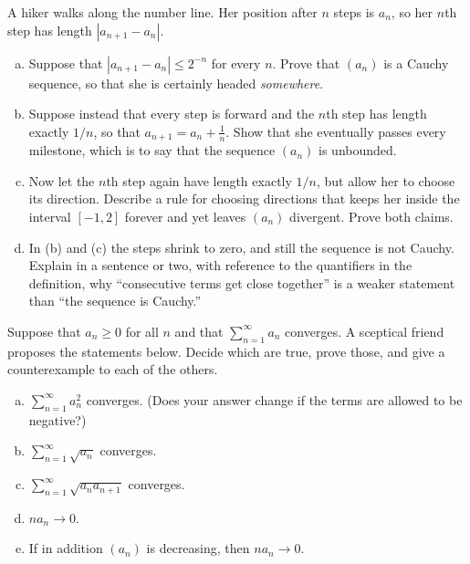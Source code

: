 \begin{problem}
A hiker walks along the number line.  Her position after $n$ steps is $a_n$, so her $n$th step has length $|a_{n+1} - a_n|$.
\begin{enumerate}[(a)]
	\item Suppose that $|a_{n+1} - a_n| \leq 2^{-n}$ for every $n$.  Prove that $(a_n)$ is a Cauchy sequence, so that she is certainly headed \emph{somewhere}.
	\item Suppose instead that every step is forward and the $n$th step has length exactly $1/n$, so that $a_{n+1} = a_n + \frac{1}{n}$.  Show that she eventually passes every milestone, which is to say that the sequence $(a_n)$ is unbounded.
	\item Now let the $n$th step again have length exactly $1/n$, but allow her to choose its direction.  Describe a rule for choosing directions that keeps her inside the interval $[-1, 2]$ forever and yet leaves $(a_n)$ divergent.  Prove both claims.
	\item In (b) and (c) the steps shrink to zero, and still the sequence is not Cauchy.  Explain in a sentence or two, with reference to the quantifiers in the definition, why ``consecutive terms get close together'' is a weaker statement than ``the sequence is Cauchy.''
\end{enumerate}
\end{problem}

\begin{problem}
Suppose that $a_n \geq 0$ for all $n$ and that $\sum_{n=1}^{\infty} a_n$ converges.  A sceptical friend proposes the statements below.  Decide which are true, prove those, and give a counterexample to each of the others.
\begin{enumerate}[(a)]
	\item $\sum_{n=1}^{\infty} a_n^2$ converges.  (Does your answer change if the terms are allowed to be negative?)
	\item $\sum_{n=1}^{\infty} \sqrt{a_n}$ converges.
	\item $\sum_{n=1}^{\infty} \sqrt{a_n a_{n+1}}$ converges.
	\item $n a_n \to 0$.
	\item If in addition $(a_n)$ is decreasing, then $n a_n \to 0$.
\end{enumerate}
\end{problem}

